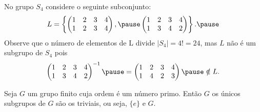 \documentclass{beamer}
\begin{document}
    \begin{frame}
        \begin{observacao}
            No grupo $S_4$ \pause considere o seguinte subconjunto: \pause
            \[
                L = \left\{\begin{pmatrix}
                    1 & 2 & 3 & 4\\
                    1 & 2 & 3 & 4
                \end{pmatrix}, \pause \begin{pmatrix}
                    1 & 2 & 3 & 4\\
                    1 & 3 & 4 & 2
                \end{pmatrix}\right\}. \pause
            \]
            Observe que o número de elementos de L \pause divide $|S_4| = 4! = 24$, \pause mas $L$ não é um subgrupo de $S_4$ \pause pois
            \[
                \begin{pmatrix}
                    1 & 2 & 3 & 4\\
                    1 & 3 & 4 & 2
                \end{pmatrix}^{-1} \pause = \begin{pmatrix}
                    1 & 2 & 3 & 4\\
                    1 & 4 & 2 & 3
                \end{pmatrix} \pause \notin L.
            \]
        \end{observacao}
    \end{frame}

%

    \begin{frame}
        \begin{corolario}
            Seja $G$ um grupo finito \pause cuja ordem é um número primo. \pause Então $G$ os únicos subgrupos de $G$ \pause são os triviais, \pause ou seja, $\{e\}$ e $G$.
        \end{corolario}
    \end{frame}
\end{document}
